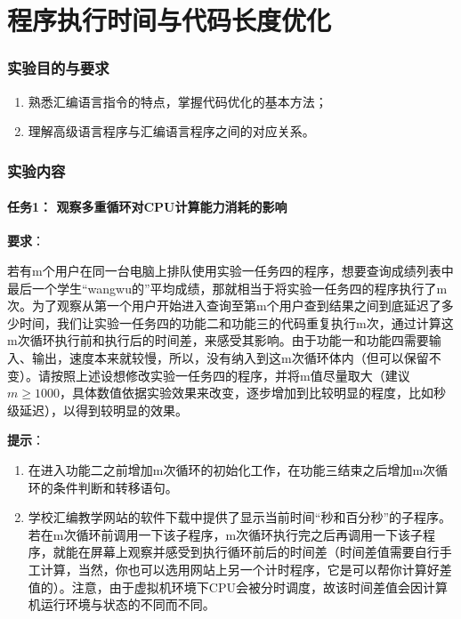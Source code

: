\documentclass{article}
\begin{document}
\newpage
\part{程序执行时间与代码长度优化}
	\section{实验目的与要求}
	\begin{enumerate}
		\item 熟悉汇编语言指令的特点，掌握代码优化的基本方法；
		\item 理解高级语言程序与汇编语言程序之间的对应关系。
	\end{enumerate}

	\section{实验内容}
	\subsection[任务1]{任务1： 观察多重循环对CPU计算能力消耗的影响}
	{\textbf{要求}}： \par
	若有m个用户在同一台电脑上排队使用实验一任务四的程序，想要查询成绩列表中最后一个学生``wangwu的''平均成绩，那就相当于将实验一任务四的程序执行了m次。为了观察从第一个用户开始进入查询至第m个用户查到结果之间到底延迟了多少时间，我们让实验一任务四的功能二和功能三的代码重复执行m次，通过计算这m次循环执行前和执行后的时间差，来感受其影响。由于功能一和功能四需要输入、输出，速度本来就较慢，所以，没有纳入到这m次循环体内（但可以保留不变）。请按照上述设想修改实验一任务四的程序，并将m值尽量取大（建议$ m \geqslant 1000 $，具体数值依据实验效果来改变，逐步增加到比较明显的程度，比如秒级延迟），以得到较明显的效果。\par
	{\textbf{提示}}： \par
	\begin{enumerate}
		\item 在进入功能二之前增加m次循环的初始化工作，在功能三结束之后增加m次循环的条件判断和转移语句。
		\item 学校汇编教学网站的软件下载中提供了显示当前时间“秒和百分秒”的子程序。若在m次循环前调用一下该子程序，m次循环执行完之后再调用一下该子程序，就能在屏幕上观察并感受到执行循环前后的时间差（时间差值需要自行手工计算，当然，你也可以选用网站上另一个计时程序，它是可以帮你计算好差值的）。注意，由于虚拟机环境下CPU会被分时调度，故该时间差值会因计算机运行环境与状态的不同而不同。
	\end{enumerate}
\end{document}
